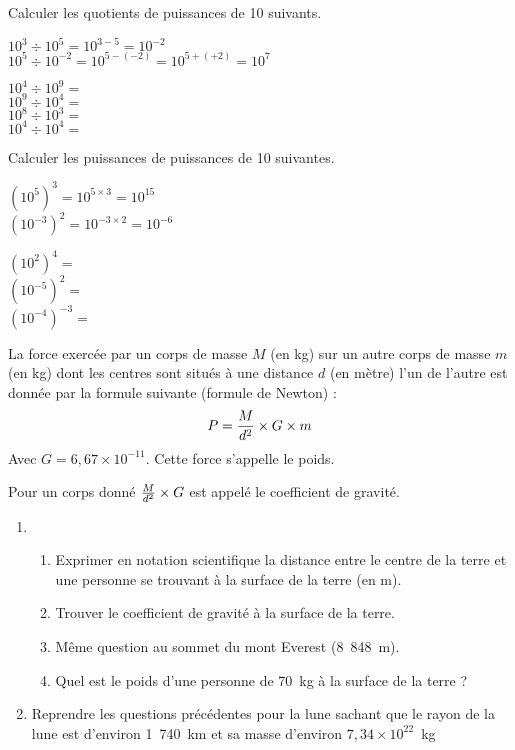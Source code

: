 \documentclass[10pt]{article}
\begin{document}
{\begin{Exo}

\def\ecrp#1#2{$10^{#1}\div10^{#2}=$}

Calculer les quotients de puissances de 10 suivants.
\begin{Ex}
$10^3\div10^5=10^{3-5}=10^{-2}$\\
$10^5\div10^{-2}=10^{5-(-2)}=10^{5+(+2)}=10^7$\\
\end{Ex}

\ecrp49\\
\ecrp94\\
\ecrp83\\
\ecrp44
\end{Exo}

\begin{Exo}
\def\ecrp#1#2{$\left(10^{#1}\right)^{#2}=$}
Calculer les puissances de puissances de 10 suivantes.
\begin{Ex}
$\left(10^5\right)^3=10^{5\times3}=10^{15}$\\
$\left(10^{-3}\right)^2=10^{-3\times2}=10^{-6}$
\end{Ex}
\ecrp24\\
\ecrp{-5}2\\
\ecrp{-4}{-3}
\end{Exo}

\begin{Exo}
La force exercée par un corps de masse $M$ (en kg) sur un autre corps
de masse $m$ (en kg) dont les centres sont situés à une distance $d$ (en mètre)
l'un de l'autre est donnée par la formule suivante (formule de Newton) :
$$P={M\over d^2}\times G\times m$$
Avec $G=6,67\times10^{-11}$. Cette force s'appelle le poids.\par
Pour un corps donné ${M\over d^2}\times G$ est appelé le coefficient de gravité.
\begin{enumerate}
\item
\begin{enumerate}
La terre a un rayon d'environ 6~378~km et une masse d'environ
$5,98\times10^{24}$~kg.
\item Exprimer en notation scientifique la distance entre le centre de la terre
et une personne se trouvant à la surface de la terre (en m).
\item Trouver le coefficient de gravité à la surface de la terre.
\item Même question au sommet du mont Everest (8~848~m).
\item Quel est le poids d'une personne de 70~kg à la surface de la terre ?
\end{enumerate}
\item Reprendre les questions précédentes pour la lune sachant que le rayon de
la lune est d'environ 1~740~km et sa masse d'environ $7,34\times10^{22}$~kg
\end{enumerate}
\end{Exo}

}
\end{document}
